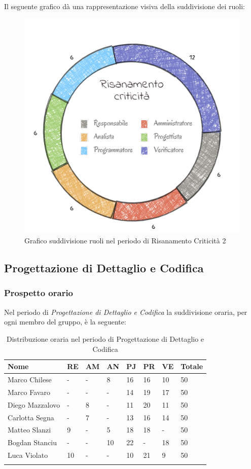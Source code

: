 Il seguente grafico dà una rappresentazione visiva della suddivisione dei ruoli:
\begin{figure}[H]
	\centering
  		\includegraphics[width=0.8\linewidth]{./images/torta_rc2.png}
  		\caption{Grafico suddivisione ruoli nel periodo di Risanamento Criticità 2}
  		\label{fig:grafico suddivione ruoli rc2}
\end{figure}

\newpage
\subsection{Progettazione di Dettaglio e Codifica}
\subsubsection{Prospetto orario}

Nel periodo di \textit{Progettazione di Dettaglio e Codifica} la suddivisione oraria, per ogni membro del gruppo, è la seguente:

\begin{longtable}{|C{.30\textwidth}|C{.06\textwidth}|C{.06\textwidth}|C{.06\textwidth} | C{.06\textwidth}| C{.06\textwidth} | C{.06\textwidth} | C{.10\textwidth} |}
	\hline
	\textbf{Nome} & \textbf{RE} & \textbf{AM} & \textbf{AN} & \textbf{PJ} & \textbf{PR} & \textbf{VE} & \textbf{Totale}\\
	\hline 
	Marco Chilese & - & - & 8 & 16 & 16 & 10 & 50 \\
	\hline
	Marco Favaro &  - & - & - & 14 & 19 & 17 & 50 \\
	\hline
	Diego Mazzalovo & - & 8 & - & 11 & 20 & 11 & 50 \\
	\hline
	Carlotta Segna & - & 7 & - & 13 & 16 & 14 & 50 \\
	\hline
	Matteo Slanzi & 9 & - & 5 & 18 & 18 & - & 50 \\
	\hline
	Bogdan Stanciu & - & - & 10 & 22 & - & 18 & 50 \\
	\hline
	Luca Violato & 10 & - & - & 10 & 21 & 9 & 50 \\   
	\hline


\caption{Distribuzione oraria nel periodo di Progettazione di Dettaglio e Codifica}
\label{Distribuzione oraria pdc}
\end{longtable}


